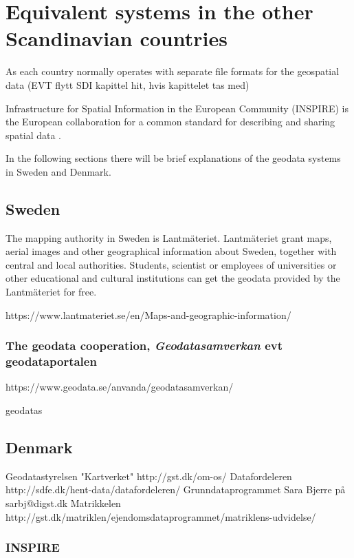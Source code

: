 \chapter{Equivalent systems in the other Scandinavian countries}
 As each country normally operates with separate file formats for the geospatial data \cite{Frenvik2017}
 (EVT flytt SDI kapittel hit, hvis kapittelet tas med)
 
 Infrastructure for Spatial Information in the European Community (INSPIRE) is the European collaboration for a common standard for describing and sharing spatial data \cite{INSPIRE}.  
 
 In the following sections there will be brief explanations of the geodata systems in Sweden and Denmark.


\section{Sweden}
The mapping authority in Sweden is Lantm\"{a}teriet. Lantm\"{a}teriet grant maps, aerial images and other geographical information about Sweden, together with central and local authorities. Students, scientist or employees of universities or other educational and cultural institutions can get the geodata provided by the Lantm\"{a}teriet for free.

https://www.lantmateriet.se/en/Maps-and-geographic-information/

\subsection{The geodata cooperation, \textit{Geodatasamverkan}  evt geodataportalen} https://www.geodata.se/anvanda/geodatasamverkan/

 
geodatas

\section{Denmark}
Geodatastyrelsen "Kartverket" http://gst.dk/om-os/
Datafordeleren http://sdfe.dk/hent-data/datafordeleren/
Grunndataprogrammet Sara Bjerre på sarbj@digst.dk
Matrikkelen http://gst.dk/matriklen/ejendomsdataprogrammet/matriklens-udvidelse/



\subsection{INSPIRE}
